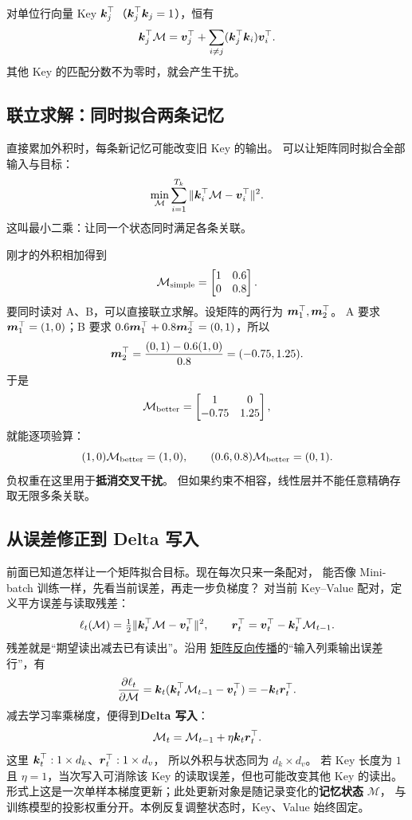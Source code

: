 对单位行向量 Key $\vect{k}_j^\top$（$\vect{k}_j^\top\vect{k}_j=1$），恒有
\[
\vect{k}_j^\top\mathcal{M}=\vect{v}_j^\top+\sum_{i\ne j}(\vect{k}_j^\top\vect{k}_i)\vect{v}_i^\top.
\]
其他 Key 的匹配分数不为零时，就会产生干扰。

\subsection{联立求解：同时拟合两条记忆}
直接累加外积时，每条新记忆可能改变旧 Key 的输出。
可以让矩阵同时拟合全部输入与目标：
\[
\boxed{\min_{\mathcal{M}}\sum_{i=1}^{T_k}\|\vect{k}_i^\top\mathcal{M}-\vect{v}_i^\top\|^2}.
\]
这叫最小二乘：让同一个状态同时满足各条关联。

刚才的外积相加得到
\[
\mathcal{M}_{\rm simple}=\begin{bmatrix}1&0.6\\0&0.8\end{bmatrix}.
\]
要同时读对 A、B，可以直接联立求解。设矩阵的两行为 $\vect{m}_1^\top,\vect{m}_2^\top$。
A 要求 $\vect{m}_1^\top=(1,0)$；B 要求 $0.6\vect{m}_1^\top+0.8\vect{m}_2^\top=(0,1)$，所以
\[
\vect{m}_2^\top=\frac{(0,1)-0.6(1,0)}{0.8}=(-0.75,1.25).
\]
于是
\[
\boxed{\mathcal{M}_{\rm better}=\begin{bmatrix}1&0\\-0.75&1.25\end{bmatrix}},
\]
就能逐项验算：
\[
(1,0)\mathcal{M}_{\rm better}=(1,0),\qquad
(0.6,0.8)\mathcal{M}_{\rm better}=(0,1).
\]
负权重在这里用于\textbf{抵消交叉干扰}。
但如果约束不相容，线性层并不能任意精确存取无限多条关联。

\subsection{从误差修正到 Delta 写入}
\label{concept:delta-rule}
前面已知道怎样让一个矩阵拟合目标。现在每次只来一条配对，
能否像 Mini-batch 训练一样，先看当前误差，再走一步负梯度？
对当前 Key--Value 配对，定义平方误差与读取残差：
\[
\ell_t(\mathcal{M})=\tfrac12\|\vect k_t^\top\mathcal{M}-\vect v_t^\top\|^2,
\qquad
\vect r_t^\top=\vect v_t^\top-\vect k_t^\top\mathcal{M}_{t-1}.
\]
残差就是“期望读出减去已有读出”。沿用
\hyperref[sec:mlp-matrix-gradient]{矩阵反向传播}的“输入列乘输出误差行”，有
\[
\frac{\partial\ell_t}{\partial\mathcal{M}}
=\vect k_t(\vect k_t^\top\mathcal{M}_{t-1}-\vect v_t^\top)
=-\vect k_t\vect r_t^\top.
\]
减去学习率乘梯度，便得到\textbf{Delta 写入}：
\[
\boxed{\mathcal{M}_t=\mathcal{M}_{t-1}+\eta\vect k_t\vect r_t^\top}.
\]
这里 $\vect k_t^\top:1\times d_k$、$\vect r_t^\top:1\times d_v$，
所以外积与状态同为 $d_k\times d_v$。
若 Key 长度为 $1$ 且 $\eta=1$，当次写入可消除该 Key 的读取误差，但也可能改变其他 Key 的读出。
形式上这是一次单样本梯度更新；此处更新对象是随记录变化的\textbf{记忆状态} $\mathcal{M}$，
与训练模型的投影权重分开。本例反复调整状态时，Key、Value 始终固定。

